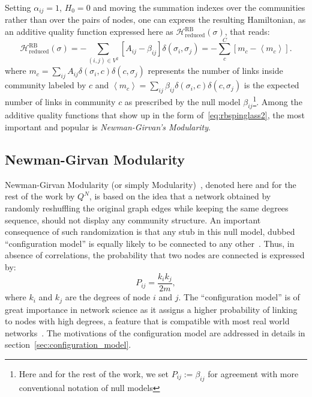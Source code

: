 Setting $\alpha_{ij}=1$, $H_0=0$ and moving the summation indexes over the communities rather than over the pairs of nodes, one can express the resulting Hamiltonian, as an additive quality function expressed here as $\mathcal{H}^{\textrm{RB}}_{\textrm{reduced}}(\sigma)$, that reads:
\begin{equation}\label{eq:rbspinglass2}
\mathcal{H}^{\textrm{RB}}_{\textrm{reduced}}(\sigma) = -\sum_{(i,j) \in V^2} \left[ A_{ij} - \beta_{ij} \right] \delta(\sigma_i,\sigma_j) = - \sum \limits_{c}^C \left[ m_c - \left< m_c \right> \right].
\end{equation}
where $m_c=\sum_{ij}A_{ij}\delta(\sigma_i,c)\delta(c,\sigma_j)$ represents the number of links inside community labeled by $c$ and $\left <m_c \right >=\sum_{ij}\beta_{ij}\delta(\sigma_i,c)\delta(c,\sigma_j)$ is the expected number of links in community $c$ as prescribed by the null model $\beta_{ij}$\footnote{Here and for the rest of the work, we set $P_{ij}:=\beta_{ij}$ for agreement with more conventional notation of null models}. 
Among the additive quality functions that show up in the form of~\ref{eq:rbspinglass2}, the most important and popular is \emph{Newman-Girvan's Modularity}.

\subsection{Newman-Girvan Modularity}\label{sec:newman_modularity}
Newman-Girvan Modularity (or simply Modularity)~\cite{newman2006}, denoted here and for the rest of the work by $Q^N$, is based on the idea that a network obtained by randomly reshuffling the original graph edges while keeping the same degrees sequence, should not display any community structure. 
An important consequence of such randomization is that any stub in this null model, dubbed ``configuration model'' is equally likely to be connected to any other~\cite{newman2010book}. Thus, in absence of correlations, the probability that two nodes are connected is expressed by:
\begin{equation}\label{eq:configuration_model}
P_{ij} = \frac{k_i k_j}{2m},
\end{equation}
where $k_i$ and $k_j$ are the degrees of node $i$ and $j$. The ``configuration model''  is of great importance in network science as it assigns a higher probability of linking to nodes with high degrees, a feature that is compatible with most real world networks~\cite{newman2010book}.
The motivations of the configuration model are addressed in details in section~\ref{sec:configuration_model}.

